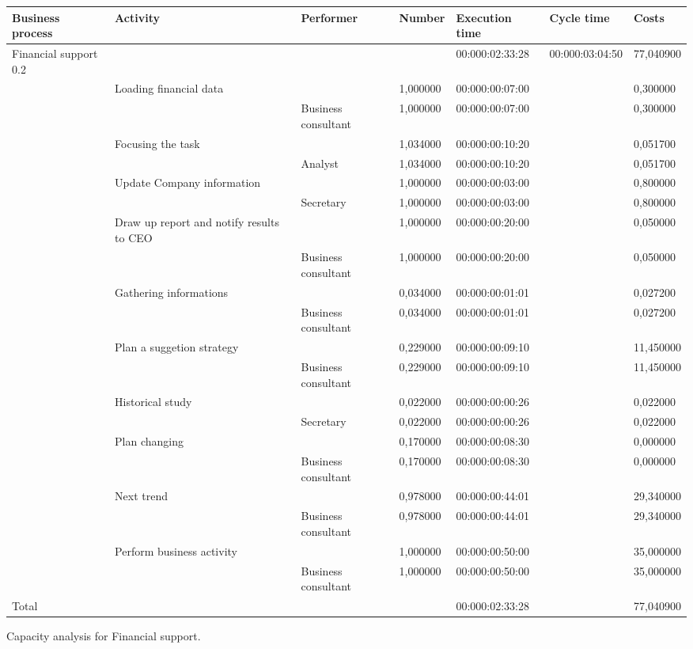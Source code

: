 \begin{landscape}
\centering
{\tiny
\begin{tabular}{|l|l|l|l|l|l|l|}
Business process&Activity&Performer&Number&Execution time&Cycle time&Costs\\
\hline
Financial support 0.2&&&&00:000:02:33:28&00:000:03:04:50&77,040900\\
\hline
&Loading financial data&&1,000000&00:000:00:07:00&&0,300000\\
\hline
&&Business consultant&1,000000&00:000:00:07:00&&0,300000\\
\hline
&Focusing the task&&1,034000&00:000:00:10:20&&0,051700\\
\hline
&&Analyst&1,034000&00:000:00:10:20&&0,051700\\
\hline
&Update Company information&&1,000000&00:000:00:03:00&&0,800000\\
\hline
&&Secretary&1,000000&00:000:00:03:00&&0,800000\\
\hline
&Draw up report and notify results to CEO&&1,000000&00:000:00:20:00&&0,050000\\
\hline
&&Business consultant&1,000000&00:000:00:20:00&&0,050000\\
\hline
&Gathering informations&&0,034000&00:000:00:01:01&&0,027200\\
\hline
&&Business consultant&0,034000&00:000:00:01:01&&0,027200\\
\hline
&Plan a suggetion strategy&&0,229000&00:000:00:09:10&&11,450000\\
\hline
&&Business consultant&0,229000&00:000:00:09:10&&11,450000\\
\hline
&Historical study&&0,022000&00:000:00:00:26&&0,022000\\
\hline
&&Secretary&0,022000&00:000:00:00:26&&0,022000\\
\hline
&Plan changing&&0,170000&00:000:00:08:30&&0,000000\\
\hline
&&Business consultant&0,170000&00:000:00:08:30&&0,000000\\
\hline
&Next trend&&0,978000&00:000:00:44:01&&29,340000\\
\hline
&&Business consultant&0,978000&00:000:00:44:01&&29,340000\\
\hline
&Perform business activity&&1,000000&00:000:00:50:00&&35,000000\\
\hline
&&Business consultant&1,000000&00:000:00:50:00&&35,000000\\
\hline
Total&&&&00:000:02:33:28&&77,040900
\end{tabular}
}
\caption{Capacity analysis for Financial support.}
\end{landscape}
%

